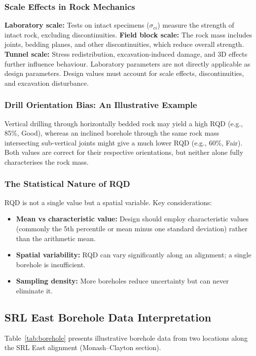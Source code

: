 \documentclass[a4paper,12pt]{article}
\begin{document}
\subsubsection{Scale Effects in Rock Mechanics}

\begin{notebox}
\textbf{Laboratory scale:} Tests on intact specimens ($\sigma_{ci}$) measure the strength of intact rock, excluding discontinuities.
\textbf{Field block scale:} The rock mass includes joints, bedding planes, and other discontinuities, which reduce overall strength.
\textbf{Tunnel scale:} Stress redistribution, excavation-induced damage, and 3D effects further influence behaviour.
Laboratory parameters are not directly applicable as design parameters. Design values must account for scale effects, discontinuities, and excavation disturbance.
\end{notebox}

\subsubsection{Drill Orientation Bias: An Illustrative Example}
Vertical drilling through horizontally bedded rock may yield a high RQD (e.g., 85\%, Good), whereas an inclined borehole through the same rock mass intersecting sub-vertical joints might give a much lower RQD (e.g., 60\%, Fair). Both values are correct for their respective orientations, but neither alone fully characterises the rock mass.

\subsubsection{The Statistical Nature of RQD}
RQD is not a single value but a spatial variable. Key considerations:
\begin{itemize}
    \item \textbf{Mean vs characteristic value:} Design should employ characteristic values (commonly the 5th percentile or mean minus one standard deviation) rather than the arithmetic mean.
    \item \textbf{Spatial variability:} RQD can vary significantly along an alignment; a single borehole is insufficient.
    \item \textbf{Sampling density:} More boreholes reduce uncertainty but can never eliminate it.
\end{itemize}

\subsection{SRL East Borehole Data Interpretation}
Table~\ref{tab:borehole} presents illustrative borehole data from two locations along the SRL East alignment (Monash--Clayton section).
\end{document}
